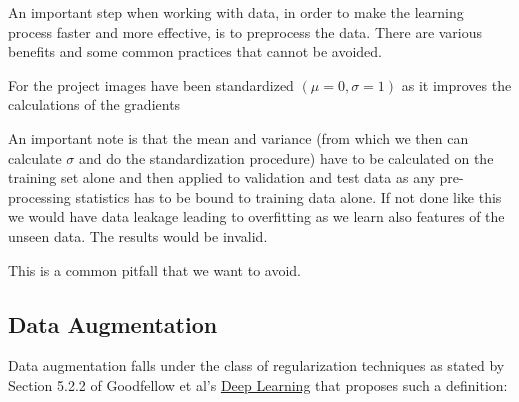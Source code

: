 An important step when working with data, in order to make the learning process faster and more effective, is to
preprocess the data. There are various benefits and some common practices that cannot be avoided.

For the project images have been standardized $(\mu=0, \sigma=1)$ as it improves the calculations of the
gradients

An important note is that the mean and variance (from which we then can calculate $\sigma$ and do
the standardization procedure) have to be calculated on the training set alone and then applied to
validation and test data as any pre-processing statistics has to be bound to training data alone.
If not done like this we would have data leakage leading to overfitting as we learn also features of the unseen data.
The results would be invalid.

This is a common pitfall that we want to avoid.

\subsection{Data Augmentation}
Data augmentation falls under the class of regularization techniques as stated by Section 5.2.2 of Goodfellow et al's
\href{http://www.deeplearningbook.org/contents/ml.html}{Deep Learning} that proposes such a definition:

